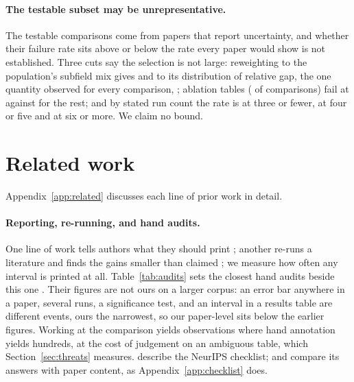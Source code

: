 \documentclass{article}
\begin{document}
\paragraph{The testable subset may be unrepresentative.} The \nNTestable{}
testable comparisons come from \nPapersContributing{} papers that report
uncertainty, and whether their failure rate sits above or below the rate every
paper would show is not established. Three cuts say the selection is not
large: reweighting to the population's subfield mix gives \nReweightedFail{}
and to its distribution of relative gap, the one quantity observed for every
comparison, \nReweightedGapsFail{}; ablation tables (\nAblationShare{} of
comparisons) fail at \nAblationFail{} against \nMainFail{} for the rest; and
by stated run count the rate is \nFailRunsLeThree{} at three or fewer,
\nFailRunsFourFive{} at four or five and \nFailRunsGeSix{} at six or more. We
claim no bound.

\section{Related work}
\label{sec:related}

Appendix~\ref{app:related} discusses each line of prior work in detail.

\paragraph{Reporting, re-running, and hand audits.} One line of work tells
authors what they should print
\citep{dodge2019show,bouthillier2021accounting,miller2024adding,bowyer2025position};
another re-runs a literature and finds the gains smaller than claimed
\citep{henderson2017deep,musgrave2020metric,dacrema2019really,saidi2024unraveling};
we measure how often any interval is printed at all. Table~\ref{tab:audits}
sets the closest hand audits beside this one
\citep{bergkirkpatrick2012empirical,dror2018hitchhiker,gundersen2018state,kirly2018nips,pham2020problems,hutchinson2022evaluation,christodoulou2024confidence,christodoulou2025false}.
Their figures are not ours on a larger corpus: an error bar anywhere in a
paper, several runs, a significance test, and an interval in a results table
are different events, ours the narrowest, so our paper-level
\nPctWithErrorBar{} sits below the earlier figures. Working at the comparison
yields \nComparisonsTwentyFive{} observations where hand annotation yields
hundreds, at the cost of judgement on an ambiguous table, which
Section~\ref{sec:threats} measures. \citet{pineau2021improving} describe the
NeurIPS checklist; \citet{magnusson2023reproducibility} and
\citet{goldberg2024usefulness} compare its answers with paper content, as
Appendix~\ref{app:checklist} does.
\end{document}
